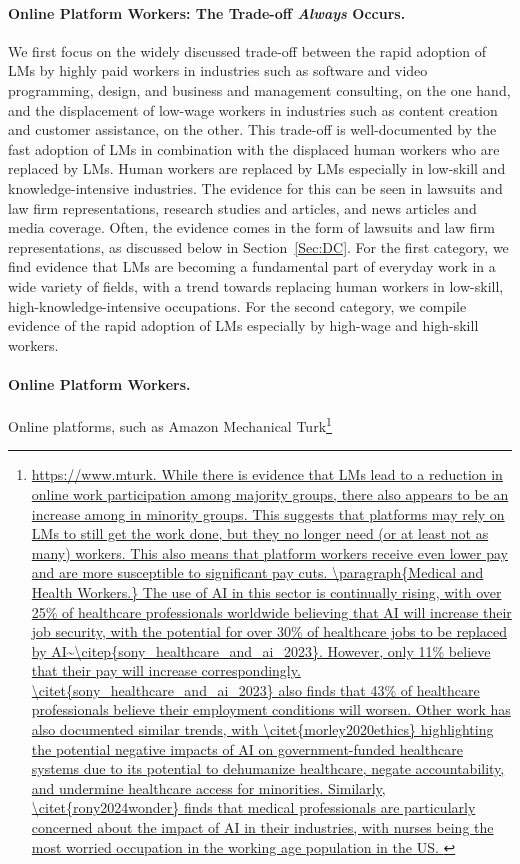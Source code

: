{{\paragraph{Online Platform Workers: The Trade-off \emph{Always} Occurs.}
We first focus on the widely discussed trade-off between the rapid adoption of LMs by highly paid workers in industries such as software and video programming, design, and business and management consulting, on the one hand, and the displacement of low-wage workers in industries such as content creation and customer assistance, on the other.
This trade-off is well-documented by the fast adoption of LMs in combination with the displaced human workers who are replaced by LMs.
Human workers are replaced by LMs especially in low-skill and knowledge-intensive industries.
The evidence for this can be seen in lawsuits and law firm representations, research studies and articles, and news articles and media coverage.
Often, the evidence comes in the form of lawsuits and law firm representations, as discussed below in Section~\ref{Sec:DC}.
For the first category, we find evidence that LMs are becoming a fundamental part of everyday work in a wide variety of fields, with a trend towards replacing human workers in low-skill, high-knowledge-intensive occupations.
For the second category, we compile evidence of the rapid adoption of LMs especially by high-wage and high-skill workers.
\paragraph{Online Platform Workers.}
Online platforms, such as Amazon Mechanical Turk\footnote{\url{https://www.mturk. While there is evidence that LMs lead to a reduction in online work participation among majority groups, there also appears to be an increase among in minority groups.
This suggests that platforms may rely on LMs to still get the work done, but they no longer need (or at least not as many) workers.
This also means that platform workers receive even lower pay and are more susceptible to significant pay cuts.
\paragraph{Medical and Health Workers.}
The use of AI in this sector is continually rising, with over 25\% of healthcare professionals worldwide believing that AI will increase their job security, with the potential for over 30\% of healthcare jobs to be replaced by AI~\citep{sony_healthcare_and_ai_2023}.
However, only 11\%  believe that their pay will increase correspondingly. 
\citet{sony_healthcare_and_ai_2023} also finds that 43\% of healthcare professionals believe their employment conditions will worsen. 
Other work has also documented similar trends, with \citet{morley2020ethics} highlighting the potential negative impacts of AI on government-funded healthcare systems due to its potential to dehumanize healthcare, negate accountability, and undermine healthcare access for minorities.
Similarly, \citet{rony2024wonder} finds that medical professionals are particularly concerned about the impact of AI in their industries, with nurses being the most worried occupation in the working age population in the US. 
}}}}
